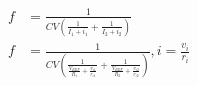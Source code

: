 \documentclass[12pt]{article}
\begin{document}
\begin{align*}
f &= \frac{1}{CV \left( \frac{1}{I_1 + i_1} + \frac{1}{I_2 + i_2} \right)}\\
f &= \frac{1}{CV \left(
		\frac{1}{
			\frac{V_{REF}}{R_1} + \frac{v_{i1}}{r_{i1}}
		} +
		\frac{1}{
			\frac{V_{REF}}{R_2} + \frac{v_{i2}}{r_{i2}}
		}
	\right)},
	i=\frac{v_i}{r_i}
\end{align*}
\end{document}
